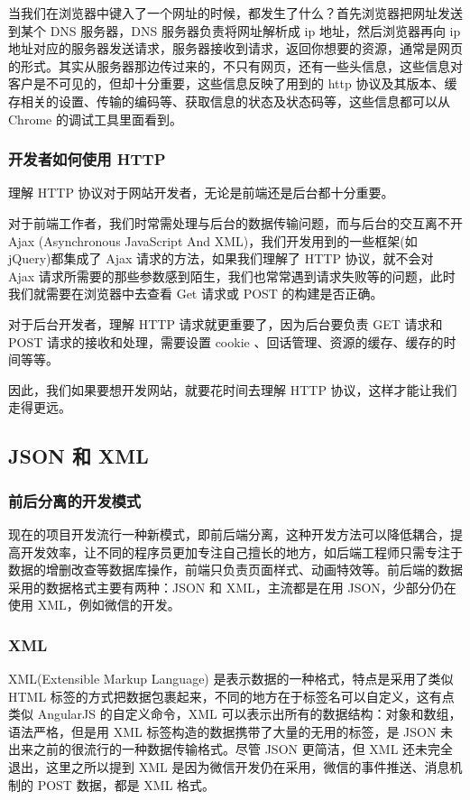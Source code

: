                 当我们在浏览器中键入了一个网址的时候，都发生了什么？首先浏览器把网址发送到某个 DNS 服务器，DNS 服务器负责将网址解析成 ip 地址，然后浏览器再向 ip 地址对应的服务器发送请求，服务器接收到请求，返回你想要的资源，通常是网页的形式。其实从服务器那边传过来的，不只有网页，还有一些头信息，这些信息对客户是不可见的，但却十分重要，这些信息反映了用到的 http 协议及其版本、缓存相关的设置、传输的编码等、获取信息的状态及状态码等，这些信息都可以从 Chrome 的调试工具里面看到。

            \subsubsection{开发者如何使用 HTTP}
              \label{subsubsec:开发者如何使用_http}
                理解 HTTP 协议对于网站开发者，无论是前端还是后台都十分重要。
                \par
                对于前端工作者，我们时常需处理与后台的数据传输问题，而与后台的交互离不开 Ajax (Asynchronous JavaScript And XML)，我们开发用到的一些框架(如 jQuery)都集成了 Ajax 请求的方法，如果我们理解了 HTTP 协议，就不会对 Ajax 请求所需要的那些参数感到陌生，我们也常常遇到请求失败等的问题，此时我们就需要在浏览器中去查看 Get 请求或 POST 的构建是否正确。
                \par
                对于后台开发者，理解 HTTP 请求就更重要了，因为后台要负责 GET 请求和 POST 请求的接收和处理，需要设置 cookie 、回话管理、资源的缓存、缓存的时间等等。
                \par
                因此，我们如果要想开发网站，就要花时间去理解 HTTP 协议，这样才能让我们走得更远。

        \subsection{JSON 和 XML}
          \label{subsec:json_和_xml}
            \subsubsection{前后分离的开发模式}
              \label{subsubsec:前后分离的开发模式}
                现在的项目开发流行一种新模式，即前后端分离，这种开发方法可以降低耦合，提高开发效率，让不同的程序员更加专注自己擅长的地方，如后端工程师只需专注于数据的增删改查等数据库操作，前端只负责页面样式、动画特效等。前后端的数据采用的数据格式主要有两种：JSON 和 XML，主流都是在用 JSON，少部分仍在使用 XML，例如微信的开发。
            \subsubsection{XML}
              \label{subsubsec:XML}
                XML(Extensible Markup Language) 是表示数据的一种格式，特点是采用了类似 HTML 标签的方式把数据包裹起来，不同的地方在于标签名可以自定义，这有点类似 AngularJS 的自定义命令，XML 可以表示出所有的数据结构：对象和数组，语法严格，但是用 XML 标签构造的数据携带了大量的无用的标签，是 JSON 未出来之前的很流行的一种数据传输格式。尽管 JSON 更简洁，但 XML 还未完全退出，这里之所以提到 XML 是因为微信开发仍在采用，微信的事件推送、消息机制的 POST 数据，都是 XML 格式。

